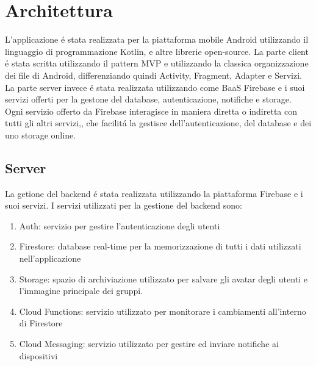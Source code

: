 
\chapter{Architettura}                %
\lhead[\fancyplain{}{\bfseries\thepage}]{\fancyplain{}{\bfseries\rightmark}}


L'applicazione \'e stata realizzata per la piattaforma mobile Android utilizzando il linguaggio di programmazione Kotlin, e altre librerie open-source. La parte client \'e stata scritta utilizzando il pattern MVP e utilizzando la classica organizzazione dei file di Android, differenziando quindi Activity, Fragment, Adapter e Servizi.\\
La parte server invece \'e stata realizzata utilizzando come BaaS Firebase e i suoi servizi offerti per la gestone del database, autenticazione, notifiche e storage.\\
Ogni servizio offerto da Firebase interagisce in maniera diretta o indiretta con tutti gli altri servizi,, che facilit\'a la gestisce dell'autenticazione, del database e dei uno storage online.\\


\newpage






\section{Server}                 %
La getione del backend \'e stata realizzata utilizzando la piattaforma Firebase e i suoi servizi.
I servizi utilizzati per la gestione del backend sono:
\begin{enumerate}
\item Auth: servizio per gestire l'autenticazione degli utenti
\item Firestore: database real-time per la memorizzazione di tutti i dati utilizzati nell'applicazione
\item Storage: spazio di archiviazione utilizzato per salvare gli avatar degli utenti e l'immagine principale dei gruppi.
\item Cloud Functions: servizio utilizzato per monitorare i cambiamenti all'interno di Firestore
\item Cloud Messaging: servizio utilizzato per gestire ed inviare notifiche ai dispositivi
\end{enumerate}




